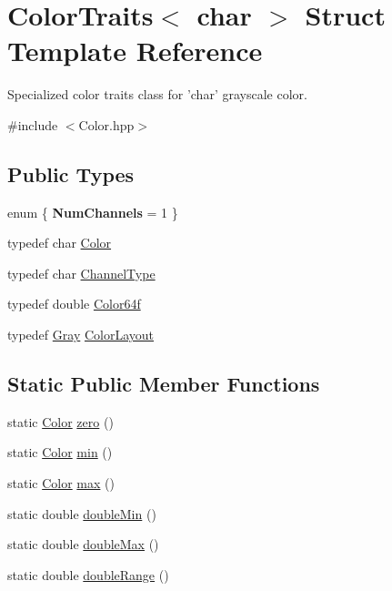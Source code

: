 \hypertarget{struct_d_o_1_1_color_traits_3_01char_01_4}{\section{Color\-Traits$<$ char $>$ Struct Template Reference}
\label{struct_d_o_1_1_color_traits_3_01char_01_4}
}


Specialized color traits class for 'char' grayscale color.  




{\ttfamily \#include $<$Color.\-hpp$>$}

\subsection*{Public Types}
\begin{DoxyCompactItemize}
\item 
enum \{ {\bfseries Num\-Channels} = 1
 \}
\item 
typedef char \hyperlink{struct_d_o_1_1_color_traits_3_01char_01_4_a5e11ed2b5bbfd2ec0290ba691e77315c}{Color}
\item 
typedef char \hyperlink{struct_d_o_1_1_color_traits_3_01char_01_4_a068771d43562e39b0f446c960a439e81}{Channel\-Type}
\item 
typedef double \hyperlink{struct_d_o_1_1_color_traits_3_01char_01_4_a9a301fd8ba0a7225e38351d3e5b2e4d3}{Color64f}
\item 
typedef \hyperlink{struct_d_o_1_1_gray}{Gray} \hyperlink{struct_d_o_1_1_color_traits_3_01char_01_4_a7c9d599cfa0d1404784fbe60e6bcfd24}{Color\-Layout}
\end{DoxyCompactItemize}
\subsection*{Static Public Member Functions}
\begin{DoxyCompactItemize}
\item 
static \hyperlink{struct_d_o_1_1_color_traits_3_01char_01_4_a5e11ed2b5bbfd2ec0290ba691e77315c}{Color} \hyperlink{struct_d_o_1_1_color_traits_3_01char_01_4_a57b00f8db42515f404e06ab933932125}{zero} ()
\item 
static \hyperlink{struct_d_o_1_1_color_traits_3_01char_01_4_a5e11ed2b5bbfd2ec0290ba691e77315c}{Color} \hyperlink{struct_d_o_1_1_color_traits_3_01char_01_4_a1cd81f912af766f8004e4d5a82a7128b}{min} ()
\item 
static \hyperlink{struct_d_o_1_1_color_traits_3_01char_01_4_a5e11ed2b5bbfd2ec0290ba691e77315c}{Color} \hyperlink{struct_d_o_1_1_color_traits_3_01char_01_4_aded391d5e231096e135e08760c0fbeb6}{max} ()
\item 
static double \hyperlink{struct_d_o_1_1_color_traits_3_01char_01_4_aa122aba748bfd453a27d2c30b368dbc3}{double\-Min} ()
\item 
static double \hyperlink{struct_d_o_1_1_color_traits_3_01char_01_4_ab9fb6b1bb12e23b725453a69f6193c30}{double\-Max} ()
\item 
static double \hyperlink{struct_d_o_1_1_color_traits_3_01char_01_4_aed64f95e634b8dac0ae5a0aed2b45740}{double\-Range} ()
\end{DoxyCompactItemize}


